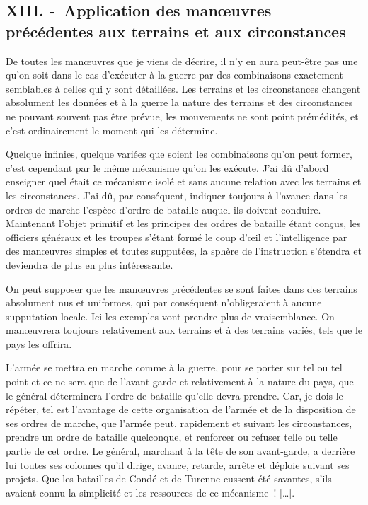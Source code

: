 \documentclass[french,twoside]{book} %
\begin{document}
\subsection[{XIII. - Application des manœuvres précédentes aux terrains et aux circonstances}]{XIII. - Application des manœuvres précédentes aux terrains et aux circonstances}
\noindent De toutes les manœuvres que je viens de décrire, il n’y en aura peut-être pas une qu’on soit dans le cas d’exécuter à la guerre par des combinaisons exactement semblables à celles qui y sont détaillées. Les terrains et les circonstances changent absolument les données et à la guerre la nature des terrains et des circonstances ne pouvant souvent pas être prévue, les mouvements ne sont point prémédités, et c’est ordinairement le moment qui les détermine.\par
Quelque infinies, quelque variées que soient les combinaisons qu’on peut former, c’est cependant par le même mécanisme qu’on les exécute. J’ai dû d’abord enseigner quel était ce mécanisme isolé et sans aucune relation avec les terrains et les circonstances. J’ai dû, par conséquent, indiquer toujours à l’avance dans les ordres de marche l’espèce d’ordre de bataille auquel ils doivent conduire. Maintenant l’objet primitif et les principes des ordres de bataille étant conçus, les officiers généraux et les troupes s’étant formé le coup d’œil et l’intelligence par des manœuvres simples et toutes supputées, la sphère de l’instruction s’étendra et deviendra de plus en plus intéressante.\par
On peut supposer que les manœuvres précédentes se sont faites dans des terrains absolument nus et uniformes, qui par conséquent n’obligeraient à aucune supputation locale. Ici les exemples vont prendre plus de vraisemblance. On manœuvrera toujours relativement aux terrains et à des terrains variés, tels que le pays les offrira.\par
L’armée se mettra en marche comme à la guerre, pour se porter sur tel ou tel point et ce ne sera que de l’avant-garde et relativement à la nature du pays, que le général déterminera l’ordre de bataille qu’elle devra prendre. Car, je dois le répéter, tel est l’avantage de cette organisation de l’armée et de la disposition de ses ordres de marche, que l’armée peut, rapidement et suivant les circonstances, prendre un ordre de bataille quelconque, et renforcer ou refuser telle ou telle partie de cet ordre. Le général, marchant à la tête de son avant-garde, a derrière lui toutes ses colonnes qu’il dirige, avance, retarde, arrête et déploie suivant ses projets. Que les batailles de Condé et de Turenne eussent été savantes, s’ils avaient connu la simplicité et les ressources de ce mécanisme ! […].\par
\end{document}
